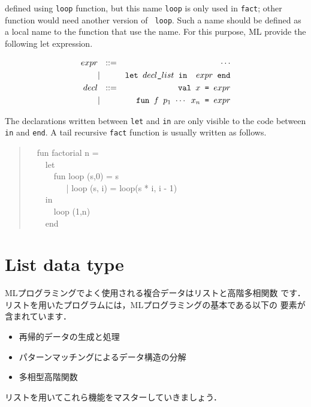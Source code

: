 \documentclass{jbook}
\newif\ifjp
\newcommand{\txt}[2]{#2}
\newcommand{\myem}{\mbox{\ \ }}
\newcommand{\myfm}{\mbox{ \ \ }}
\begin{document}
defined using {\tt loop} function, but this name {\tt loop} is only
used in {\tt fact}; other function would need another version of {\tt
loop}.
	Such a name should be defined as a local name to the function
that use the name.
	For this purpose, ML provide the following let expression.
\begin{tt}
\begin{eqnarray*}
expr &\mbox{\ \ }::=& \cdots \\
     &|& \mbox{\tt let\ $decl\_list$\ in \ $expr$\ end}
\\
decl &\mbox{\ \ }::=& \mbox{\tt val\ $x$ = $expr$}
\\
     &|& \mbox{\tt fun\ $f$\ $p_1$ $\cdots$ $x_n$ =  $expr$}
\end{eqnarray*}
\end{tt}
	The declarations written between 
{\tt let} and {\tt in} are only visible to the code between {\tt in} and
{\tt end}.
	A tail recursive {\tt fact} function is usually written as follows.
\begin{tt}
\begin{quote}
\myem  fun factorial n =
\\\myem\myem    let
\\\myem\myem\myem      fun loop (s,0) = s
\\\myem\myem\myem\myfm        | loop (s, i) = loop(s * i, i - 1)
\\\myem\myem    in
\\\myem\myem\myem      loop (1,n)
\\\myem\myem    end
\end{quote}
\end{tt}
\fi%

\section{\txt{リストデータ型}{List data type}}
\label{sec:tutorialList}

\ifjp%
	MLプログラミングでよく使用される複合データはリストと高階多相関数
です．
	リストを用いたプログラムには，MLプログラミングの基本である以下の
要素が含まれています．
\begin{itemize}
\item 
再帰的データの生成と処理
\item 
パターンマッチングによるデータ構造の分解
\item 
多相型高階関数
\end{itemize}
	リストを用いてこれら機能をマスターしていきましょう．
\end{document}

